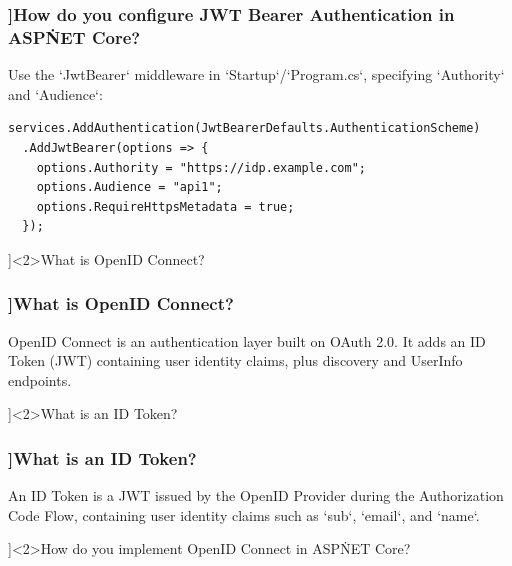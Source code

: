 \begin{frame}[fragile]
  \frametitle{\AnswerTitle[\CategoryBadge[OOPColor!20]{C\#} ]{How do you configure JWT Bearer Authentication in ASP\.NET Core?}}

  {\footnotesize
  Use the `JwtBearer` middleware in `Startup`/`Program.cs`, specifying `Authority` and `Audience`:
  }

  \begin{verbatim}
services.AddAuthentication(JwtBearerDefaults.AuthenticationScheme)
  .AddJwtBearer(options => {
    options.Authority = "https://idp.example.com";
    options.Audience = "api1";
    options.RequireHttpsMetadata = true;
  });
  \end{verbatim}
\end{frame}

\QuestionSlide[\CategoryBadge[AuthColor!20]{Security}]<2>{What is OpenID Connect?}

\begin{frame}[fragile]
  \frametitle{\AnswerTitle[\CategoryBadge[OOPColor!20]{C\#} ]{What is OpenID Connect?}}

  {\footnotesize
  OpenID Connect is an authentication layer built on OAuth 2.0. It adds an ID Token (JWT) containing user identity claims, plus discovery and UserInfo endpoints.
  }
\end{frame}

\QuestionSlide[\CategoryBadge[AuthColor!20]{Security}]<2>{What is an ID Token?}

\begin{frame}[fragile]
  \frametitle{\AnswerTitle[\CategoryBadge[OOPColor!20]{C\#} ]{What is an ID Token?}}

  {\footnotesize
  An ID Token is a JWT issued by the OpenID Provider during the Authorization Code Flow, containing user identity claims such as `sub`, `email`, and `name`.
  }
\end{frame}

\QuestionSlide[\CategoryBadge[AuthColor!20]{Security}]<2>{How do you implement OpenID Connect in ASP\.NET Core?}

